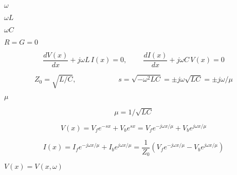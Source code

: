 {\newpage\clearpage
{}%
$\omega$%
\lthtmlinlinemathZ
\lthtmlcheckvsize\clearpage}

{\newpage\clearpage
{}%
$\omega L$%
\lthtmlinlinemathZ
\lthtmlcheckvsize\clearpage}

{\newpage\clearpage
{}%
$\omega C$%
\lthtmlinlinemathZ
\lthtmlcheckvsize\clearpage}

{\newpage\clearpage
{}%
$R=G=0$%
\lthtmlinlinemathZ
\lthtmlcheckvsize\clearpage}

{\newpage\clearpage
{}%
\begin{displaymath}
\frac{dV(x)}{dx}+j\omega L\,I(x)=0,\;\;\;\;\;\;\;\;\frac{dI(x)}{dx}+j\omega C\,V(x)=0 
\end{displaymath}%
\lthtmldisplayZ
\lthtmlcheckvsize\clearpage}

{\newpage\clearpage
{}%
\begin{displaymath} Z_0 = \sqrt{L/C},\;\;\;\;\;\;\;\;\;\;\;\;\;\;\;\;\;\;\;\;\;
s = \sqrt{-\omega^2 LC}=\pm j\omega\sqrt{LC}=\pm j\omega/\mu  \end{displaymath}%
\lthtmldisplayZ
\lthtmlcheckvsize\clearpage}

{\newpage\clearpage
{}%
$\mu$%
\lthtmlinlinemathZ
\lthtmlcheckvsize\clearpage}

{\newpage\clearpage
{}%
\begin{displaymath} \mu=1/\sqrt{LC} \end{displaymath}%
\lthtmldisplayZ
\lthtmlcheckvsize\clearpage}

{\newpage\clearpage
{}%
\begin{displaymath} V(x) = V_f e^{-sx}+V_b e^{sx} = V_f e^{-j\omega x/\mu}+V_b e^{j\omega x/\mu} 
\end{displaymath}%
\lthtmldisplayZ
\lthtmlcheckvsize\clearpage}

{\newpage\clearpage
{}%
\begin{displaymath} I(x) = I_f e^{-j\omega x/\mu}+I_b e^{j\omega x/\mu}
=\frac{1}{Z_0}\left(V_fe^{-j\omega x/\mu}-V_be^{j\omega x/\mu} \right) \end{displaymath}%
\lthtmldisplayZ
\lthtmlcheckvsize\clearpage}

{\newpage\clearpage
{}%
$V(x)=V(x,\omega)$%
\lthtmlinlinemathZ
\lthtmlcheckvsize\clearpage}


